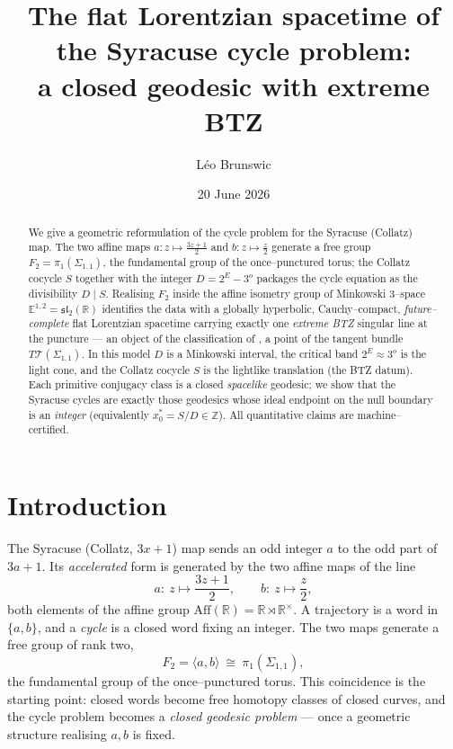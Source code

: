 \documentclass[11pt,a4paper]{article}
\title{The flat Lorentzian spacetime of the Syracuse cycle problem:\\
       a closed geodesic with extreme BTZ}
\author{L\'eo Brunswic}
\date{20 June 2026}
\theoremstyle{bourbaki}
\theoremstyle{bourbakidef}
\newcommand{\Z}{\mathbb{Z}}
\newcommand{\R}{\mathbb{R}}
\newcommand{\Emink}{\mathbb{E}^{1,2}}
\newcommand{\slt}{\mathfrak{sl}_2(\R)}
\newcommand{\Teich}{\mathcal{T}}
\begin{document}
\maketitle

\begin{abstract}
We give a geometric reformulation of the cycle problem for the Syracuse (Collatz) map.
The two affine maps $a:z\mapsto\tfrac{3z+1}{2}$ and $b:z\mapsto\tfrac{z}{2}$ generate a
free group $F_2=\pi_1(\Sigma_{1,1})$, the fundamental group of the once--punctured torus;
the Collatz cocycle $S$ together with the integer $D=2^E-3^o$ packages the cycle equation
as the divisibility $D\mid S$. Realising $F_2$ inside the affine isometry group of
Minkowski $3$--space $\Emink=\slt$ identifies the data with a globally hyperbolic,
Cauchy--compact, \emph{future--complete} flat Lorentzian spacetime carrying exactly one
\emph{extreme BTZ} singular line at the puncture --- an object of the classification of
\cite{Brunswic2021}, a point of the tangent bundle $T\Teich(\Sigma_{1,1})$. In this model
$D$ is a Minkowski interval, the critical band $2^E\approx 3^o$ is the light cone, and the
Collatz cocycle $S$ is the lightlike translation (the BTZ datum). Each primitive conjugacy
class is a closed \emph{spacelike} geodesic; we show that the Syracuse cycles are exactly
those geodesics whose ideal endpoint on the null boundary is an \emph{integer}
(equivalently $x_0^\ast=S/D\in\Z$). All quantitative claims are machine--certified.
\end{abstract}

\section{Introduction}

The Syracuse (Collatz, $3x+1$) map sends an odd integer $a$ to the odd part of
$3a+1$. Its \emph{accelerated} form is generated by the two affine maps of the line
\begin{equation}\label{eq:gens}
  a:\ z\longmapsto \frac{3z+1}{2},\qquad b:\ z\longmapsto \frac{z}{2},
\end{equation}
both elements of the affine group $\mathrm{Aff}(\R)=\R\rtimes\R^\times$. A trajectory is a
word in $\{a,b\}$, and a \emph{cycle} is a closed word fixing an integer. The two maps
generate a free group of rank two,
\[
  F_2=\langle a,b\rangle\ \cong\ \pi_1(\Sigma_{1,1}),
\]
the fundamental group of the once--punctured torus. This coincidence is the starting point:
closed words become free homotopy classes of closed curves, and the cycle problem becomes a
\emph{closed geodesic problem} --- once a geometric structure realising $a,b$ is fixed.
\end{document}
